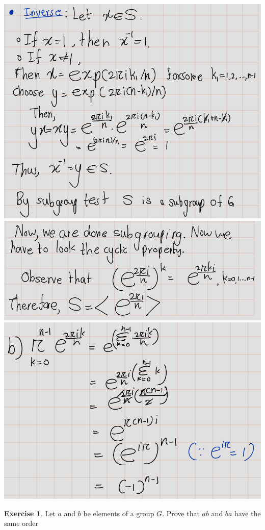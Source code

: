 \documentclass[
]{book}
\theoremstyle{definition}
\theoremstyle{definition}
\theoremstyle{definition}
\newtheorem{exercise}{Exercise}[chapter]
\theoremstyle{definition}
\theoremstyle{remark}
\begin{document}
\includegraphics{figures/ch_2/fig26.png}
\includegraphics{figures/ch_2/fig27.png}
\includegraphics{figures/ch_2/fig28.png}

\begin{exercise}
\protect\hypertarget{exr:unnamed-chunk-58}{}\label{exr:unnamed-chunk-58}Let \(a\) and \(b\) be elements of a group \(G\). Prove that \(ab\) and \(ba\) have the same order
\end{exercise}
\end{document}
